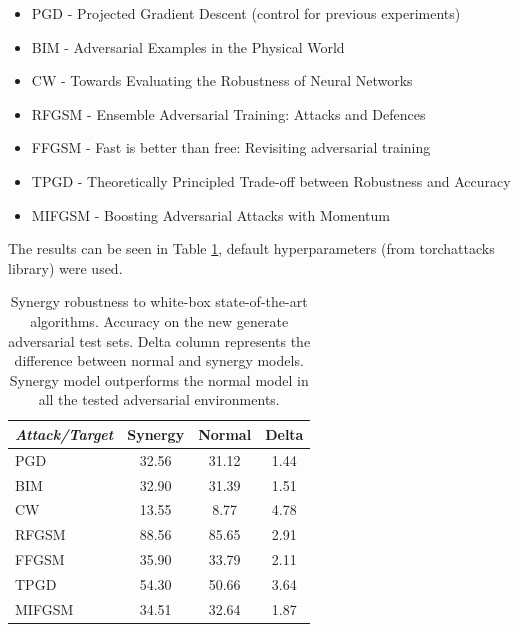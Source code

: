 \documentclass[b5paper]{book}
\let\cite\parencite
\begin{document}
\begin{itemize}
    \item PGD - Projected Gradient Descent (control for previous experiments) \cite{madry2017towards}
    \item BIM - Adversarial Examples in the Physical World \cite{kurakin2016adversarial}
    \item CW - Towards Evaluating the Robustness of Neural Networks \cite{carlini2017towards}
    \item RFGSM - Ensemble Adversarial Training: Attacks and Defences \cite{tramer2017ensemble}
    \item FFGSM - Fast is better than free: Revisiting adversarial training \cite{wong2020fast}
    \item TPGD - Theoretically Principled Trade-off between Robustness and Accuracy \cite{zhang2019theoretically}
    \item MIFGSM - Boosting Adversarial Attacks with Momentum \cite{dong2015image}
\end{itemize}

The results can be seen in Table \ref{tab:results-others-synergy}, default hyperparameters (from torchattacks \cite{kim2020torchattacks} library) were used.

\begin{table}[ht]
  \centering
  \begin{tabular}{l|cc|c}
    \toprule
     \textit{Attack/Target} & {Synergy} & {Normal} & Delta \\
    \midrule
    {PGD \cite{madry2017towards}} & {32.56} & {31.12} & {1.44} \\
    {BIM \cite{kurakin2016adversarial}} & {32.90} & {31.39} & {1.51} \\
    {CW \cite{carlini2017towards}} & {13.55} & {8.77} & {4.78} \\
    {RFGSM \cite{tramer2017ensemble}} & {88.56} & {85.65} & {2.91} \\
    {FFGSM \cite{wong2020fast}} & {35.90} & {33.79} & {2.11} \\
    {TPGD \cite{zhang2019theoretically}} & {54.30} & {50.66} & {3.64} \\
    {MIFGSM \cite{dong2015image}} & {34.51} & {32.64} & {1.87} \\
    \bottomrule
  \end{tabular}
  \caption{Synergy robustness to white-box state-of-the-art algorithms. Accuracy on the new generate adversarial test sets. Delta column represents the difference between normal and synergy models. Synergy model outperforms the normal model in all the tested adversarial environments.}
  \label{tab:results-others-synergy}
\end{table} 
\end{document}

